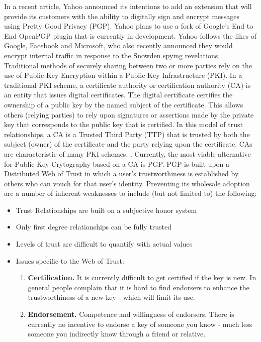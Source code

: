 \documentclass{llncs}
\begin{document}
In a recent article, Yahoo announced its intentions to add an extension that will provide its customers with the ability to digitally sign and encrypt messages using Pretty Good Privacy (PGP).  Yahoo plans to use a fork of Google's End to End OpenPGP plugin that is currently in development.  Yahoo follows the likes of Google, Facebook and Microsoft, who also recently announced they would encrypt internal traffic in response to the Snowden spying revelations \cite{yahoo}.  Traditional methods of securely sharing between two or more parties rely on the use of Public-Key Encryption within a Public Key Infrastructure (PKI).  In a traditional PKI scheme, a certificate authority or certification authority (CA) is an entity that issues digital certificates. The digital certificate certifies the ownership of a public key by the named subject of the certificate. This allows others (relying parties) to rely upon signatures or assertions made by the private key that corresponds to the public key that is certified. In this model of trust relationships, a CA is a Trusted Third Party (TTP) that is trusted by both the subject (owner) of the certificate and the party relying upon the certificate. CAs are characteristic of many PKI schemes. \cite{ca}.   Currently, the most viable alternative for Public Key Crytography based on a CA is PGP.  PGP is built upon a Distributed Web of Trust in which a user's trustworthiness is established by others who can vouch for that user's identity.  Preventing its wholesale adoption are a number of inherent weaknesses to include (but not limited to) the following: 

\begin {itemize}
\item Trust Relationships are built on a subjective honor system  
\item Only first degree relationships can be fully trusted
\item Levels of trust are difficult to quantify with actual values 
\item Issues specific to the Web of Trust:\\ 
\begin {enumerate}
\item \textbf{Certification.} It is currently difficult to get certified if the key is new. In general people complain that it is hard to find endorsers to enhance the trustworthiness of a new key - which will limit its use.
\item \textbf{Endorsement.} Competence and willingness of endorsers.  There is currently no incentive to endorse a key of someone you know - much less someone you indirectly know through a friend or relative.
\end {enumerate}
\end {itemize}
\end{document}
